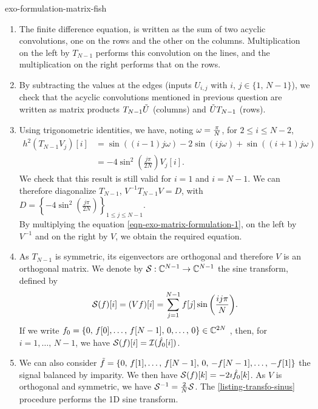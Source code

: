  
\begin{correction}{exo-formulation-matrix-fish}
\begin{enumerate}
\item The finite difference equation, is written as the sum of two acyclic convolutions, one on the rows and the other on the columns. Multiplication on the left by $ T_{N-1} $ performs this convolution on the lines, and the multiplication on the right performs that on the rows.
\item By subtracting the values at the edges (inputs $ U_{i, j} $ with $ i, \, j \in \{1, \, N-1\} $), we check that the acyclic convolutions mentioned in previous question are written as matrix products $ T_{N-1} \tilde{U} $ (columns) and $ \tilde{U} T_{N-1} $ (rows).
\item Using trigonometric identities, we have, noting $ \omega = \frac{\pi}{N} $, for $ 2 \leq i \leq N-2 $,
\begin{align*}
h^2 (T_{N-1} V_j) [i] & = \sin \left((i-1) j \omega \right) - 2 \sin \left(ij \omega \right) + \sin \left((i+1) j \omega \right) \\
& = -4 \sin^2 \left(\frac{j \pi}{2N} \right) V_j [i].
\end{align*}
 We check that this result is still valid for $ i = 1 $ and $ i = N-1 $. We can therefore diagonalize $ T_{N-1} $, $ V^{-1} T_{N-1} V = D $, with $ D = \left\{-4 \sin^2 \left(\tfrac{j \pi}{2N} \right) \right\}_{1 \leq j \leq N-1} $. \\By multiplying the equation \eqref{eqn-exo-matrix-formulation-1}, on the left by $ V^{-1} $ and on the right by $ V $, we obtain the required equation.
\item As $ T_{N-1} $ is symmetric, its eigenvectors are orthogonal and therefore $ V $ is an orthogonal matrix. We denote by $ \mathcal{S}: \mathbb{C}^{N-1} \rightarrow \mathbb{C}^{N-1} $ the sine transform, defined by
\begin{equation*}
\mathcal{S} (f) [i] = (V f) [i] = \sum_{j = 1}^{N-1}{f [j] \sin \left(\frac{ij \pi}{N} \right)}.
\end{equation*}
If we write $ f_0 = \{0, \, f [0], \ldots, \, f [N-1], \, 0, \ldots, \, 0\} \in \mathbb{C}^{2N} $ , then, for $ i = 1, \ldots, \, N-1 $, we have $ \mathcal{S} (f) [i] = \mathcal{I} (\hat{f_0}[i]) $.
\item We can also consider $ \tilde{f} = \{0, \, f [1], \ldots, \, f [N-1], \, 0, \, - f [N-1], \ldots, \, - f [1]\} $ the signal balanced by imparity. We then have $ \mathcal{S} (f) [k] = -2 \imath \hat{f_0}[k] $. As $ V $ is orthogonal and symmetric, we have $ \mathcal{S}^{-1} = \frac{2}{N} \mathcal{S} $. The \Matlab{} \ref{listing-transfo-sinus} procedure performs the 1D sine transform.


\end{enumerate}
\end{correction}
